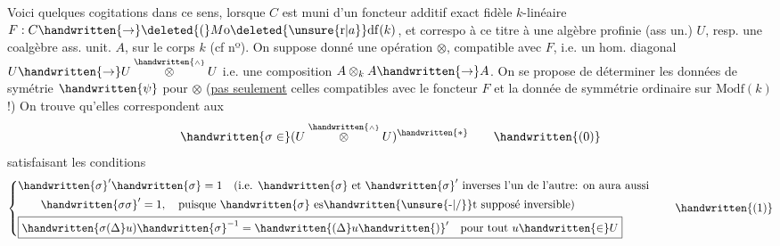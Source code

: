 Voici quelques cogitations dans ce sens, lorsque $C$ est muni d'un foncteur additif exact fidèle $k$-linéaire $F:C\handwritten{\to}\deleted{(}M\mathrm{o}\deleted{\unsure{\mathrm r|a}}\mathrm{df}(k)$, et correspo à ce titre à une algèbre profinie (ass un.) $U$, resp. une coalgèbre ass. unit. $A$, sur le corps $k$ (cf nº). On  suppose donné une opération $\otimes$, compatible avec $F$, i.e. un hom. diagonal $U\handwritten{\to}U\overset{\handwritten{\scriptscriptstyle\wedge}}{\otimes}U$ i.e. une composition $A\otimes_kA\handwritten{\to}A$. On se propose de déterminer les données de symétrie $\handwritten{\psi}$ pour $\otimes$ (\uline{pas seulement} celles compatibles avec le foncteur $F$ et la donnée de symmétrie ordinaire sur $\mathrm{Modf}(k)$ !) On trouve qu'elles correspondent aux
\margin{\handwritten{[Dans le cas du nº 6, gr\uline{.dué}, on aura $\sigma=\pi^+\unsure{\otimes|\ominus}\pi^++\pi^+\otimes\pi^-+\pi^-\unsure{\otimes|\ominus}\pi^+-\pi^-\unsure{\otimes|\ominus}\pi^-$]}}
\[
\handwritten{\sigma\in}(U\overset{\handwritten{\scriptscriptstyle\wedge}}{\otimes}U)^{\handwritten{*}}
\tag*{\handwritten{(0)}}
\]
satisfaisant les conditions
\[
\left\{\begin{aligned}
&\handwritten{\sigma}'\handwritten{\sigma}=1\quad\text{(i.e. }\handwritten{\sigma}\text{ et }\handwritten{\sigma}'\text{ inverses l'un de l'autre: on aura aussi}\\
&\qquad\handwritten{\sigma\sigma}'=1,\quad\text{puisque }\handwritten{\sigma}\text{ es\handwritten{\unsure{-|/}}t supposé inversible)}\\
&\boxed{\handwritten{\sigma(\Delta}u)\handwritten{\sigma}^{-1}=\handwritten{(\Delta}u\handwritten{)}'\quad\text{pour tout }u\handwritten{\in}U}
\end{aligned}\right.
\tag*{\handwritten{(1)}}
\]
